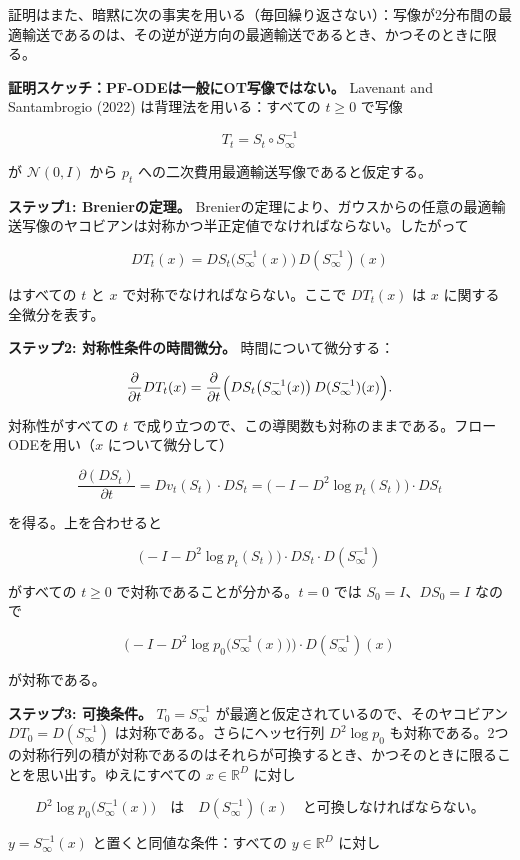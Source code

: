 証明はまた、暗黙に次の事実を用いる（毎回繰り返さない）：写像が2分布間の最適輸送であるのは、その逆が逆方向の最適輸送であるとき、かつそのときに限る。

\textbf{証明スケッチ：PF-ODEは一般にOT写像ではない。} Lavenant and Santambrogio (2022) は背理法を用いる：すべての $t\ge 0$ で写像

\[
T_t=S_t\circ S_\infty^{-1}
\]


が $\mathcal{N}(0,I)$ から $p_t$ への二次費用最適輸送写像であると仮定する。

\textbf{ステップ1: Brenierの定理。} Brenierの定理により、ガウスからの任意の最適輸送写像のヤコビアンは対称かつ半正定値でなければならない。したがって

\[
DT_t(x)=DS_t\bigl(S_\infty^{-1}(x)\bigr)\,D(S_\infty^{-1})(x)
\]


はすべての $t$ と $x$ で対称でなければならない。ここで $DT_t(x)$ は $x$ に関する全微分を表す。

\textbf{ステップ2: 対称性条件の時間微分。} 時間について微分する：

\[
\frac{\partial}{\partial t}DT_t(x)=\frac{\partial}{\partial t}\Bigl(DS_t\bigl(S_\infty^{-1}(x)\bigr)\,D(S_\infty^{-1})(x)\Bigr).
\]


対称性がすべての $t$ で成り立つので、この導関数も対称のままである。フローODEを用い（$x$ について微分して）

\[
\frac{\partial(DS_t)}{\partial t}=Dv_t(S_t)\cdot DS_t=\bigl(-I-D^2\log p_t(S_t)\bigr)\cdot DS_t
\]


を得る。上を合わせると

\[
\bigl(-I-D^2\log p_t(S_t)\bigr)\cdot DS_t\cdot D(S_\infty^{-1})
\]


がすべての $t\ge 0$ で対称であることが分かる。$t=0$ では $S_0=I$、$DS_0=I$ なので

\[
\bigl(-I-D^2\log p_0\bigl(S_\infty^{-1}(x)\bigr)\bigr)\cdot D(S_\infty^{-1})(x)
\]


が対称である。

\textbf{ステップ3: 可換条件。} $T_0=S_\infty^{-1}$ が最適と仮定されているので、そのヤコビアン $DT_0=D(S_\infty^{-1})$ は対称である。さらにヘッセ行列 $D^2\log p_0$ も対称である。2つの対称行列の積が対称であるのはそれらが可換するとき、かつそのときに限ることを思い出す。ゆえにすべての $x\in\mathbb{R}^D$ に対し

\[
D^2\log p_0\bigl(S_\infty^{-1}(x)\bigr)\quad\text{は}\quad D(S_\infty^{-1})(x)\quad\text{と可換しなければならない。}
\]


$y=S_\infty^{-1}(x)$ と置くと同値な条件：すべての $y\in\mathbb{R}^D$ に対し


